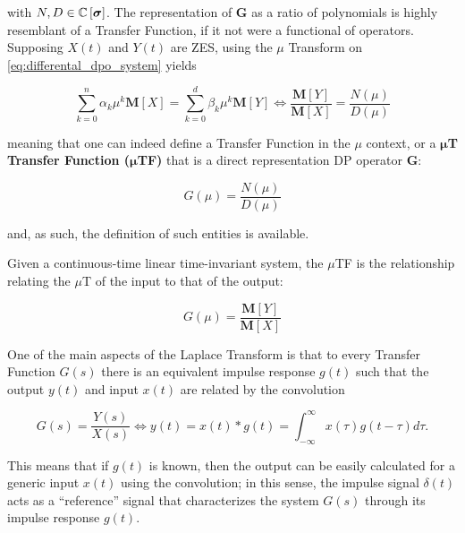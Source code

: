 	\noindent with $N,D\in\mathbb{C}\left[\boldsymbol{\sigma}\right]$. The representation of $\mathbf{G}$ as a ratio of polynomials is highly resemblant of a Transfer Function, if it not were a functional of operators. Supposing $X(t)$ and $Y(t)$ are ZES, using the $\mu$ Transform on \eqref{eq:differental_dpo_system} yields

\begin{equation} \sum_{k=0}^{n} \alpha_k \mu^k \mathbf{M} \left[X\right] = \sum_{k=0}^{d} \beta_k \mu^k \mathbf{M}\left[Y\right] \Leftrightarrow \dfrac{\mathbf{M}\left[Y\right]}{\mathbf{M}\left[X\right]} = \dfrac{N\left(\mu\right)}{D\left(\mu\right)} \label{eq:intuition_mutfs}\end{equation}

	\noindent meaning that one can indeed define a Transfer Function in the $\mu$ context, or a \textbf{$\boldsymbol{\mu}$T Transfer Function ($\boldsymbol{\mu}$TF)} that is a direct representation DP operator $\mathbf{G}$:

\begin{equation} G\left(\mu\right) = \dfrac{N\left(\mu\right)}{D\left(\mu\right)} \end{equation}

	\noindent and, as such, the definition of such entities is available.

\begin{definition}\label{def:muT_TFs}
	Given a continuous-time linear time-invariant system, the $\mu$TF is the relationship relating the $\mu$T of the input to that of the output:

\begin{equation} G\left(\mu\right) = \dfrac{\mathbf{M}\left[Y\right]}{\mathbf{M}\left[X\right]} \end{equation}
\end{definition}

	One of the main aspects of the Laplace Transform is that to every Transfer Function $G(s)$ there is an equivalent impulse response $g(t)$ such that the output $y(t)$ and input $x(t)$ are related by the convolution

\begin{equation} G(s) = \dfrac{Y(s)}{X(s)} \Leftrightarrow y(t) = x(t)\ast g(t) = \int_{-\infty}^{\infty} x\left(\tau\right) g\left(t - \tau\right)d\tau . \label{eq:ltf_convo}\end{equation}

	This means that if $g(t)$ is known, then the output can be easily calculated for a generic input $x(t)$ using the convolution; in this sense, the impulse signal $\delta(t)$ acts as a ``reference'' signal that characterizes the system $G(s)$ through its impulse response $g(t)$. 

